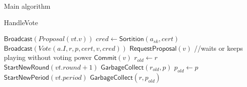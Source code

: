 \documentclass[10pt,a4paper]{article}
\begin{document}
\begin{section}{Main algorithm}
\begin{subsection}{HandleVote}
\begin{algorithm}[H]
\begin{algorithmic}[1]
                    \State $\mathsf{Broadcast}(Proposal(vt.v))$
                \EndIf
                        \State $cred \gets 
                        \mathsf{Sortition}(a_{sk}, cert)$
                            \State $\mathsf{Broadcast}(Vote(a.I, r, p, cert, v, cred))$
                        \EndIf
                    \EndFor
                \EndIf
                        \State $\mathsf{RequestProposal}(v)$ //waits or keeps playing without voting power
                    \EndIf
                    \State $\mathsf{Commit}(v)$  %
                    \State $r_{old} \gets r$
                    \State $\mathsf{StartNewRound}(vt.round+1)$
                    \State $\mathsf{GarbageCollect}(r_{old}, p)$
                \EndIf
                    \State $p_{old} \gets p$
                    \State $\mathsf{StartNewPeriod}(vt.period)$
                    \State $\mathsf{GarbageCollect}(r, p_{old})$
                \EndIf
            \EndIf

        \EndFunction
        \end{algorithmic}
    \end{algorithm}
    

\end{subsection}
\end{section}
\end{document}
